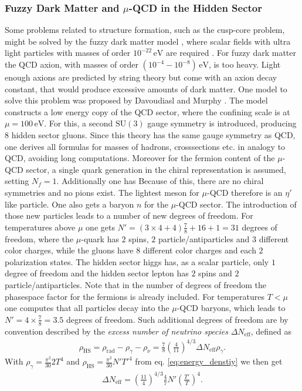 \documentclass[twoside,a4paper, 12pt]{article}
\numberwithin{equation}{section}
\begin{document}
\subsubsection{Fuzzy Dark Matter and $\mu$-QCD in the Hidden Sector}
\label{sec:micro_qcd}
Some problems related to structure formation, such as the cusp-core problem, 
might be solved by the fuzzy dark matter model \cite{FuzzyDarkMatter}, where
scalar fields with ultra light particles with masses of order $10^{-22} \, \mathrm{eV}$ are required \cite{FuzzyDarkMatter}. 
For fuzzy dark matter the QCD axion, with masses of order $(10^{-4} - 10^{-8}) \, \mathrm{eV}$, is too heavy. 
Light enough axions are predicted by string theory but come with an axion decay constant, that would produce excessive amounts of dark matter.
One model to solve this problem was proposed by Davoudiasl and Murphy \cite{microqcd}.
The model constructs a low energy copy of the QCD sector, where the confining scale is at $\mu = 100 \, \mathrm{eV}$.
For this, a second $\mathrm{SU}(3)$ gauge symmetry is introduced, producing 8 hidden sector gluons. Since this theory has the same gauge symmetry as
QCD, one derives all formulas for masses of hadrons, crosssections etc.
in analogy to QCD, avoiding long computations.
Moreover for the fermion content of the $\mu$-QCD sector, a single quark generation in the chiral representation is assumed, setting $N_f = 1$.
Additionally one has 
Because of this, there are no chiral symmetries and no pions exist.
The lightest meson for $\mu$-QCD therefore is an $\eta'$ like particle.
One also gets a baryon $n$ for the $\mu$-QCD sector.
The introduction of those new particles leads to a number of new
degrees of freedom. For temperatures above $\mu$
one gets $N' = (3 \times 4 + 4) \frac{7}{8} + 16 + 1 = 31$
degrees of freedom,
where the $\mu$-quark 
has $2$ spins, $2$ particle/antiparticles and $3$ different color charges, while the gluons have $8$ different color charges and
each $2$ polarization states.
The hidden sector higgs has, as a scalar particle, only $1$ degree of freedom
and the hidden sector lepton has $2$ spins and $2$ particle/antiparticles.
Note that in the number of degrees of freedom the phasespace factor for the fermions is already included.
For temperatures $T < \mu$ one computes that all particles decay into the $\mu$-QCD baryons, which leads to
$N' = 4 \times \frac{7}{8} = 3.5$ degrees of freedom.
Such additional degrees of freedom are by convention
described by the \emph{excess number of neutrino species} $\Delta N_\mathrm{eff}$, defined as
\cite[Sec. 4.1]{IAXOPhysics}
\begin{align}
    \label{eq:Delta_N_eff}
    \rho_\mathrm{HS} = \rho_\mathrm{rad} - \rho_\gamma - \rho_\nu =
    \frac{7}{8} \left( \frac{4}{11} \right)^{4/3} \Delta N_\mathrm{eff} \rho_\gamma.
\end{align}
With $\rho_\gamma = \frac{\pi^2}{30} 2 T^4$ and $\rho_\mathrm{HS} = \frac{\pi^2}{30} N' T'^4 $ from eq. \eqref{eq:energy_denstiy} we then get
\begin{align}
    \label{eq:DeltaN_eff_comp}
    \Delta N_\mathrm{eff} = \left( \frac{11}{4} \right)^{4 / 3} \frac{4}{7} N' \left( \frac{T'}{T} \right)^4.
\end{align}
\end{document}
